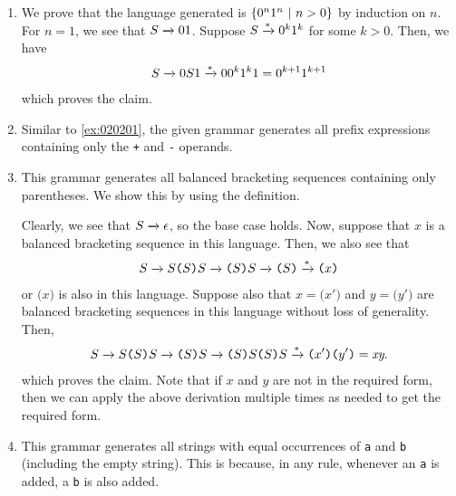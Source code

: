 \begin{solution}\label{sol:020202}
    \begin{enumerate}[label=\alph*)]
        \item We prove that the language generated is $\left\{ 0^n1^n\ |\ n > 0 \right\}$ 
        by induction on $n$. For $n = 1$, we see that $S \xrightarrow{} 01$. Suppose 
        $S \xrightarrow{*} 0^k1^k$ for some $k > 0$. Then, we have
        \begin{align*}
            S \xrightarrow{} 0S1 \xrightarrow{*} 00^k1^k1 = 0^{k+1}1^{k+1}
        \end{align*}
        which proves the claim.

        \item Similar to \cref{ex:020201}, the given grammar generates all prefix 
        expressions containing only the \texttt{+} and \texttt{-} operands.

        \item This grammar generates all balanced bracketing sequences containing only
        parentheses. We show this by using the definition.

        \noindent Clearly, we see that $S \xrightarrow{} \epsilon$, so the base 
        case holds. Now, suppose that $x$ is a balanced bracketing sequence 
        in this language. Then, we also see that
        \begin{align*}
            S \xrightarrow{} S\texttt{(}S\texttt{)}S \xrightarrow{} \texttt{(}S\texttt{)}S 
            \xrightarrow{} \texttt{(}S\texttt{)} \xrightarrow{*} \texttt{(}x\texttt{)}
        \end{align*}
        or $\texttt{(}x\texttt{)}$ is also in this language. Suppose also 
        that $x = \texttt{(}x'\texttt{)}$ and $y = \texttt{(}y'\texttt{)}$ are 
        balanced bracketing sequences in this language without loss of 
        generality. Then,
        \begin{align*}
            S \xrightarrow{} S\texttt{(}S\texttt{)}S \xrightarrow{} \texttt{(}S\texttt{)}S
            \xrightarrow{} \texttt{(}S\texttt{)}S\texttt{(}S\texttt{)}S
            \xrightarrow{*} \texttt{(}x'\texttt{)(}y'\texttt{)} = \textit{xy}. 
        \end{align*}
        which proves the claim. Note that if $x$ and $y$ are not in the required 
        form, then we can apply the above derivation multiple times as needed to 
        get the required form.

        \item This grammar generates all strings with equal occurrences of 
        \texttt{a} and \texttt{b} (including the empty string). This is 
        because, in any rule, whenever an \texttt{a} is added, a \texttt{b} 
        is also added.


\end{enumerate}
\end{solution}
